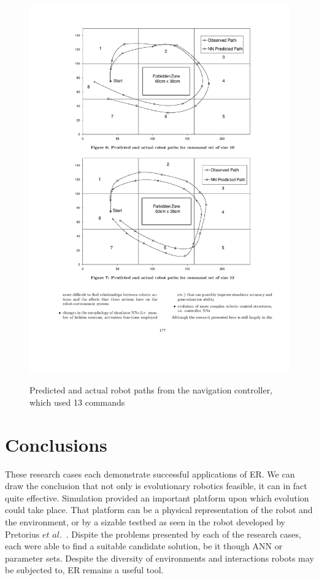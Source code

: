 \documentclass{sig-alternate}
\begin{document}
\begin{figure}%
\center
\caption{Predicted and actual robot paths from the navigation controller, which used 13 commands}

  \includegraphics[scale=1]{cr3}
\label{fig:position tracking grid}
\end{figure}
	  
\section{Conclusions}\label{conclusion}

 These research cases each demonstrate successful applications of ER. We can draw the conclusion that not only is evolutionary robotics feasible, it can in fact quite effective. Simulation provided an important platform upon which evolution could take place. That platform can be a physical representation of the robot and the environment, or by a sizable testbed as seen in the robot developed by Pretorius $et$ $al.$~\cite{Pretorius:2009:TAN:1632149.1632171}. Dispite the problems presented by each of the research cases, each were able to find a suitable candidate solution, be it though ANN or parameter sets. Despite the diversity of environments and interactions robots may be subjected to, ER remains a useful tool.
\end{document}

